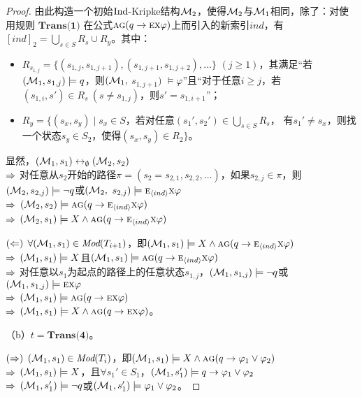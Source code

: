 \begin{proof}
	由此构造一个初始$\textrm{Ind}$-Kripke结构${\cal M}_2$，使得${\cal M}_2$与${\cal M}_1$相同，除了：对使用规则 $\textbf{Trans(1)}$ 在公式$\textsc{a}\textsc{g}(q \rightarrow \textsc{e} \textsc{x} \varphi)$上而引入的新索引$ind$，有$[ind]_2=\bigcup_{s\in S} R_s \cup R_y$。其中：
	\begin{itemize}
		\item $R_{s_{1,j}}=\{(s_{1,j}, s_{1,j+1}), (s_{1,j+1}, s_{1,j+2}),\dots\}$ $(j\geq 1)$，其满足“若$({\cal M}_1,s_{1,j}) \models q$，则$({\cal M}_1,$ $s_{1,j+1})$ $\models \varphi$”且“对于任意$i\geq j$，若$(s_{1,i}, s') \in R_s\ (s \not= s_{1,j})$，则$s'=s_{1,i+1}$”；
		\item $R_y=\{(s_x,s_y)\mid s_x\in S$，若对任意$(s_1',s_2') \in \bigcup_{s\in S} R_s$， 有$s_1'\not= s_x$，则找一个状态$s_y\in S_2$，使得$(s_x,s_y)\in R_2\}$。
	\end{itemize}
	
	显然，$({\cal M}_1,s_1) \leftrightarrow_{\emptyset} ({\cal M}_2,s_2)$\\
	$\Rightarrow$ 对任意从$s_2$开始的路径$\pi=( s_2= s_{2,1} , s_{2,2}, \dots)$，如果$s_{2,j} \in \pi$，则$({\cal M}_2,s_{2,j}) \models \neg q$或$({\cal M}_2,$ $s_{2,j})\models \textsc{e}_{{\langle{ind}\rangle}} \textsc{x} \varphi$\\
	$\Rightarrow$ $({\cal M}_2,s_2)\models \textsc{a}\textsc{g}(q \rightarrow \textsc{e}_{{\langle{ind}\rangle}} \textsc{x} \varphi)$\\
	$\Rightarrow$ $({\cal M}_2,s_1) \models X \wedge \textsc{a}\textsc{g}(q \rightarrow \textsc{e}_{{\langle{ind}\rangle}} \textsc{x} \varphi)$
	
	$(\Leftarrow)$ $\forall ({\cal M}_1,s_1) \in \textit{Mod}(T_{i+1})$，即$({\cal M}_1,s_1) \models X \wedge \textsc{a} \textsc{g}(q \rightarrow \textsc{e}_{{\langle{ind}\rangle}} \textsc{x} \varphi )$\\
	$\Rightarrow$ $({\cal M}_1,s_1) \models X$且$({\cal M}_1,s_1) \models \textsc{a} \textsc{g}(q \rightarrow \textsc{e}_{{\langle{ind}\rangle}} \textsc{x} \varphi)$\\
	$\Rightarrow$ 对任意以$s_1$为起点的路径上的任意状态$s_{1,j}$，$({\cal M}_1,s_{1,j}) \models \neg q$或$({\cal M}_1,s_{1,j}) \models \textsc{e}\textsc{x}\varphi$\\
	$\Rightarrow$ $({\cal M}_1,s_1) \models \textsc{a}\textsc{g}(q \rightarrow \textsc{e} \textsc{x} \varphi)$\\
	$\Rightarrow$ $({\cal M}_1,s_1) \models X \wedge \textsc{a}\textsc{g}(q \rightarrow \textsc{e} \textsc{x} \varphi)$。
	
	（b）$t=\textbf{Trans(4)}$。
	
	$(\Rightarrow)$	$({\cal M}_1,s_1) \in \textit{Mod}(T_i)$，即$({\cal M}_1,s_1) \models X \wedge \textsc{a}\textsc{g} (q \rightarrow \varphi_1 \vee \varphi_2)$ \\
	$\Rightarrow$ $({\cal M}_1,s_1) \models X$，且$\forall s_1'\in S_1$，$({\cal M}_1, s_1') \models q \rightarrow \varphi_1 \vee \varphi_2$\\
	$\Rightarrow$ $({\cal M}_1,s_1')\models \neg q$或$({\cal M}_1,s_1')\models \varphi_1 \vee \varphi_2$。
	

\end{proof}
